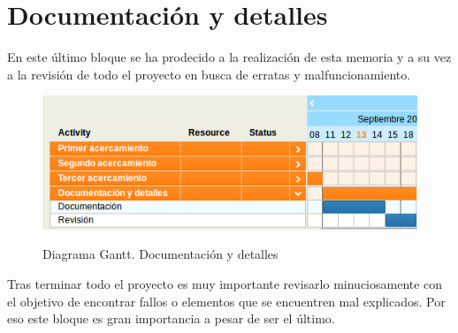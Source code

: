 \section{Documentación y detalles}

En este último bloque se ha prodecido a la realización de esta memoria y a su vez a la revisión de todo el proyecto en busca de erratas y malfuncionamiento.\\

\begin{figure}[H] %
\centering
\includegraphics[scale=0.5]{imagenes/gant4.png}  %
\label{gant4.png}
\caption{Diagrama Gantt. Documentación y detalles}
\end{figure}

Tras terminar todo el proyecto es muy importante revisarlo minuciosamente con el objetivo de encontrar fallos o elementos que se encuentren mal explicados. Por eso este bloque es gran importancia a pesar de ser el último.
